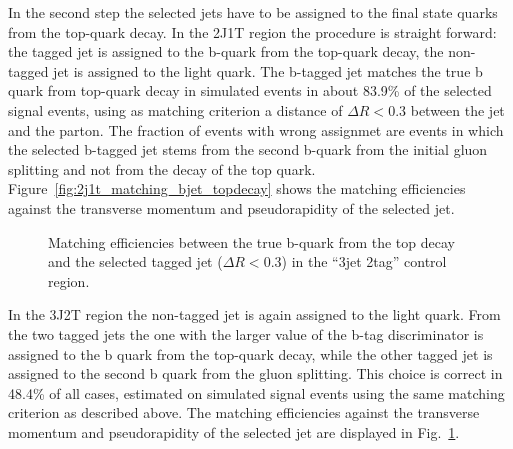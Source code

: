 In the second step the selected jets have to be assigned to the final state quarks from the top-quark decay. In the 2J1T region the procedure is straight forward: the tagged jet is assigned to the b-quark from the top-quark decay, the non-tagged jet is assigned to the light quark. The b-tagged jet matches the true b quark  from top-quark decay in simulated events in about 83.9\% of the selected signal events, using as matching criterion a distance of $\Delta R < 0.3$ between the jet and the parton. The fraction of events with wrong assignmet are events in which the selected b-tagged jet stems from the second b-quark from the initial gluon splitting and not from the decay of the top quark. Figure~\ref{fig:2j1t_matching_bjet_topdecay} shows the matching efficiencies against the transverse momentum and pseudorapidity of the selected jet.


\begin{figure}[hbpt]
\begin{center}
\hspace{0.05\textwidth}
\caption{\label{fig:3j2t_matching_bjet_topdecay}Matching efficiencies between the true b-quark from the top decay and the selected tagged jet ($\Delta R<0.3$) in the ``3jet 2tag'' control region.}
\end{center}
\end{figure}


In the 3J2T region the non-tagged jet is again assigned to the light quark. From the two tagged jets the one with the larger value of the b-tag discriminator is assigned to the b quark from the top-quark decay, while the other tagged jet is assigned to the second b quark from the gluon splitting. This choice is correct in 48.4\% of all cases, estimated on simulated signal events using the same matching criterion as described above. The matching efficiencies against the transverse momentum and pseudorapidity of the selected jet are displayed in Fig.~\ref{fig:3j2t_matching_bjet_topdecay}.

